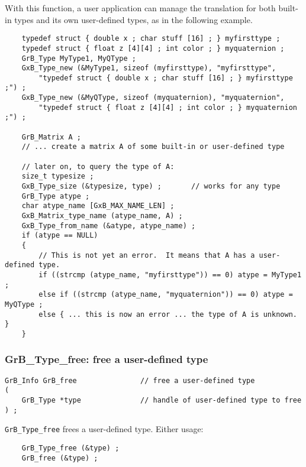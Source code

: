 \documentclass[12pt]{article}
\begin{document}
With this function, a user application can manage the translation for
both built-in types and its own user-defined types, as in the following
example.

{\footnotesize
\begin{verbatim}
    typedef struct { double x ; char stuff [16] ; } myfirsttype ;
    typedef struct { float z [4][4] ; int color ; } myquaternion ;
    GrB_Type MyType1, MyQType ;
    GxB_Type_new (&MyType1, sizeof (myfirsttype), "myfirsttype",
        "typedef struct { double x ; char stuff [16] ; } myfirsttype ;") ;
    GxB_Type_new (&MyQType, sizeof (myquaternion), "myquaternion",
        "typedef struct { float z [4][4] ; int color ; } myquaternion ;") ;

    GrB_Matrix A ;
    // ... create a matrix A of some built-in or user-defined type

    // later on, to query the type of A:
    size_t typesize ;
    GxB_Type_size (&typesize, type) ;       // works for any type
    GrB_Type atype ;
    char atype_name [GxB_MAX_NAME_LEN] ;
    GxB_Matrix_type_name (atype_name, A) ;
    GxB_Type_from_name (&atype, atype_name) ;
    if (atype == NULL)
    {
        // This is not yet an error.  It means that A has a user-defined type.
        if ((strcmp (atype_name, "myfirsttype")) == 0) atype = MyType1 ;
        else if ((strcmp (atype_name, "myquaternion")) == 0) atype = MyQType ;
        else { ... this is now an error ... the type of A is unknown.  }
    }\end{verbatim} }

\newpage
\subsubsection{{\sf GrB\_Type\_free:} free a user-defined type}
\label{type_free}

\begin{mdframed}[userdefinedwidth=6in]
{\footnotesize
\begin{verbatim}
GrB_Info GrB_free               // free a user-defined type
(
    GrB_Type *type              // handle of user-defined type to free
) ;
\end{verbatim}
}\end{mdframed}

\verb'GrB_Type_free' frees a user-defined type.
Either usage:

    {\small
    \begin{verbatim}
    GrB_Type_free (&type) ;
    GrB_free (&type) ; \end{verbatim}}
\end{document}
